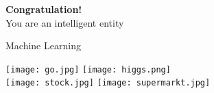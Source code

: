 \begin{frame}
	\begin{center}
		{\huge \textbf{Congratulation!}} \\
         {\large You are an intelligent entity} \\
         \vspace*{3em}
         
	\end{center}
\end{frame}


\begin{frame}{Machine Learning}
	\begin{center}
		\hspace{0.5em}\texttt{[image: go.jpg]}\hspace{0.5em}
		\texttt{[image: higgs.png]}\\
		\vspace*{0.5em}
		\hspace{0.5em}\texttt{[image: stock.jpg]}\hspace{0.5em}
		\texttt{[image: supermarkt.jpg]}\\
	\end{center}
\end{frame}

